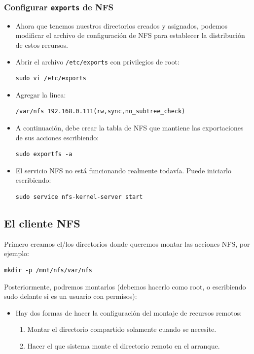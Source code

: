 \documentclass[a4paper,11pt]{article}
\begin{document}
\subsubsection{Configurar \texttt{exports} de NFS}
\begin{itemize}
\item Ahora que tenemos nuestros directorios creados y asignados, podemos
      modificar el archivo de configuración de NFS para establecer la
      distribución de estos recursos.
\item Abrir el archivo \texttt{/etc/exports} con privilegios de root:
\begin{verbatim}
sudo vi /etc/exports
\end{verbatim}
\item Agregar la linea:
\begin{verbatim}
/var/nfs 192.168.0.111(rw,sync,no_subtree_check)
\end{verbatim}
\item A continuación, debe crear la tabla de NFS que mantiene las
exportaciones de sus acciones escribiendo:
\begin{verbatim}
sudo exportfs -a
\end{verbatim}
\item El servicio NFS no está funcionando realmente todavía. Puede
iniciarlo escribiendo:
\begin{verbatim}
sudo service nfs-kernel-server start
\end{verbatim}

\end{itemize}

\subsection{El cliente NFS}

Primero creamos el/los directorios donde queremos montar las acciones NFS, por
ejemplo:

\begin{verbatim}
mkdir -p /mnt/nfs/var/nfs
\end{verbatim}

Posteriormente, podremos montarlos (debemos hacerlo como root, o
escribiendo sudo delante si es un usuario con permisos):

\begin{itemize}
  \item Hay dos formas de hacer la configuración del montaje de recursos
        remotos:
        \begin{enumerate}
          \item Montar el directorio compartido solamente cuando se
                necesite.
          \item Hacer el que sistema monte el directorio remoto en el
                arranque.
        \end{enumerate}
\end{itemize}
\end{document}
